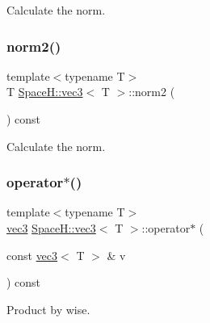Calculate the norm. 

\mbox{\label{struct_space_h_1_1vec3_a62dcbdc184d4228da839845c7e179eea}} 
\subsubsection{\texorpdfstring{norm2()}{norm2()}\hspace{0.1cm}{\footnotesize\ttfamily [4/4]}}
{\footnotesize\ttfamily template$<$typename T$>$ \\
T \mbox{\hyperlink{struct_space_h_1_1vec3}{Space\+H\+::vec3}}$<$ T $>$\+::norm2 (\begin{DoxyParamCaption}{ }\end{DoxyParamCaption}) const\hspace{0.3cm}{\ttfamily [inline]}}



Calculate the norm. 

\mbox{\label{struct_space_h_1_1vec3_a5399298171d5e12e7b76ade00ab7d67d}} 
\subsubsection{\texorpdfstring{operator$\ast$()}{operator*()}\hspace{0.1cm}{\footnotesize\ttfamily [1/7]}}
{\footnotesize\ttfamily template$<$typename T$>$ \\
\mbox{\hyperlink{struct_space_h_1_1vec3}{vec3}} \mbox{\hyperlink{struct_space_h_1_1vec3}{Space\+H\+::vec3}}$<$ T $>$\+::operator$\ast$ (\begin{DoxyParamCaption}\item[{const \mbox{\hyperlink{struct_space_h_1_1vec3}{vec3}}$<$ T $>$ \&}]{v }\end{DoxyParamCaption}) const\hspace{0.3cm}{\ttfamily [inline]}}



Product by wise. 

